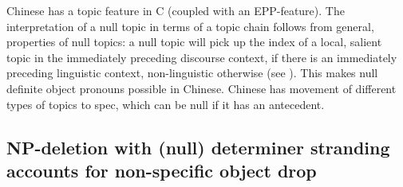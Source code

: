 \documentclass[output=paper]{LSP/langsci}
\begin{document}
Chinese has a topic feature in C (coupled with an EPP-feature). The interpretation of a null topic in terms of a topic chain follows from general,  properties of null topics: a null topic will pick up the index of a local, salient topic in the immediately preceding discourse context, if there is an immediately preceding linguistic context, non-linguistic otherwise (see \citealt{FrascarelliHinterhölzl2007}). This makes null definite object pronouns possible in Chinese. Chinese has movement of different types of topics to spec,  which can be null if it has an antecedent.


\subsection{NP-deletion with (null) determiner stranding accounts for non-specific object drop}
\end{document}
